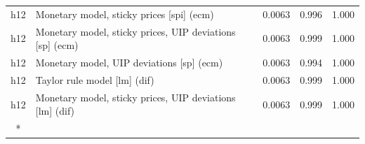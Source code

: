 \begin{ThreePartTable}
\begin{longtable}[t]{cp{5.5cm}ccc}
h12 & \raggedright Monetary model, sticky prices [spi] (ecm) & 0.0063 & 0.996 & 1.000\\
h12 & \raggedright Monetary model, sticky prices, UIP deviations [sp] (ecm) & 0.0063 & 0.999 & 1.000\\
h12 & \raggedright Monetary model, UIP deviations [sp] (ecm) & 0.0063 & 0.994 & 1.000\\
h12 & \raggedright Taylor rule model [lm] (dif) & 0.0063 & 0.999 & 1.000\\
h12 & \raggedright Monetary model, sticky prices, UIP deviations [lm] (dif) & 0.0063 & 0.999 & 1.000\\*
\end{longtable}
\end{ThreePartTable}
\endgroup{}
